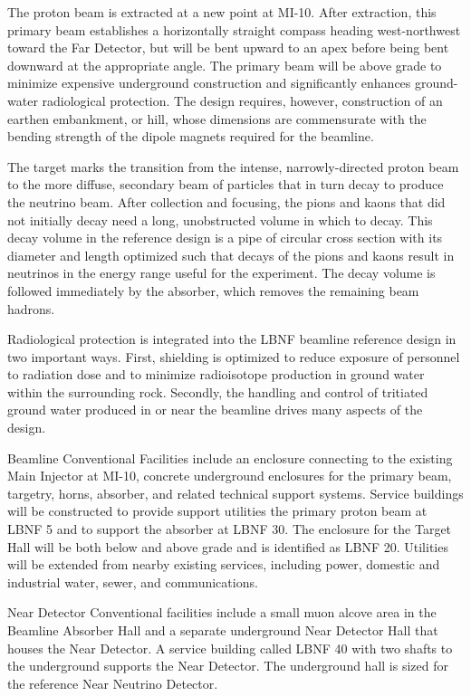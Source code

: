 The proton beam is extracted at a new point at MI-10. After extraction, this primary beam establishes a horizontally straight compass heading west-northwest toward the Far Detector, but will be bent upward to an apex before being bent downward at the appropriate angle. The primary beam will be above grade to minimize expensive underground construction and significantly enhances ground-water radiological protection. The design requires, however, construction of an earthen embankment, or hill, whose dimensions are commensurate with the bending strength of the dipole magnets required for the beamline. 

The target marks the transition from the intense, narrowly-directed proton beam to the more diffuse, secondary beam of particles that in turn decay to produce the neutrino beam. After collection and focusing, the pions and kaons that did not initially decay need a long, unobstructed volume in which to decay. This decay volume in the reference design is a pipe of circular cross section with its diameter and length optimized such that decays of the pions and kaons result in neutrinos in the energy range useful for the experiment. The decay volume is followed immediately by the absorber, which removes the remaining beam hadrons. 

Radiological protection is integrated into the LBNF beamline reference design in two important ways. First, shielding is optimized to reduce exposure of personnel to radiation dose and to minimize radioisotope production in ground water within the surrounding rock. Secondly, the handling and control of tritiated ground water produced in or near the beamline drives many aspects of the design. 

Beamline Conventional Facilities include an enclosure connecting to the existing Main Injector at MI-10, concrete underground enclosures for the primary beam, targetry, horns, absorber, and related technical support systems. Service buildings will be constructed to provide support utilities the primary proton beam at LBNF 5 and to support the absorber at LBNF 30. The enclosure for the Target Hall will be both below and above grade and is identified as LBNF 20.  Utilities will be extended from nearby existing services, including power, domestic and industrial water, sewer, and communications. 

Near Detector Conventional facilities include a small muon alcove area in the Beamline Absorber Hall and a separate underground Near Detector Hall that houses the Near Detector. A service building called LBNF 40 with two shafts to the underground supports the Near Detector. The underground hall is sized for the reference Near Neutrino Detector.




